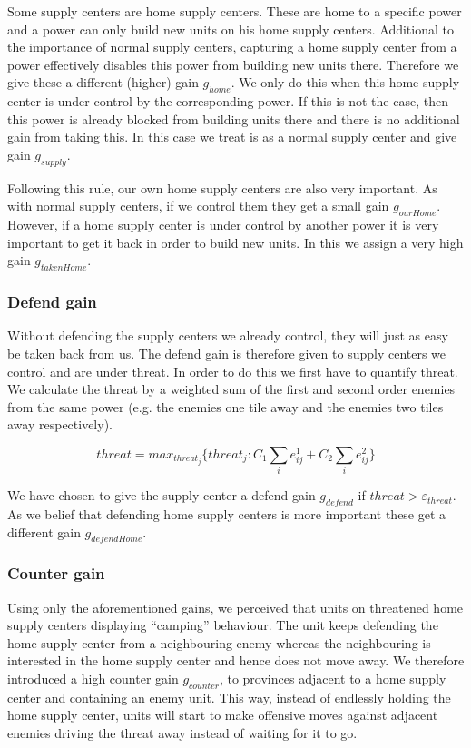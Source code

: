 \documentclass[a4paper]{article} %
\begin{document}
Some supply centers are home supply centers. These are home to a specific power and a power can only build new units on his home supply centers. Additional to the importance of normal supply centers, capturing a home supply center from a power effectively disables this power from building new units there. Therefore we give these a different (higher) gain $g_{home}$. We only do this when this home supply center is under control by the corresponding power. If this is not the case, then this power is already blocked from building units there and there is no additional gain from taking this. In this case we treat is as a normal supply center and give gain $g_{supply}$.

Following this rule, our own home supply centers are also very important. As with normal supply centers, if we control them they get a small gain $g_{ourHome}$. However, if a home supply center is under control by another power it is very important to get it back in order to build new units. In this we assign a very high gain $g_{takenHome}$. 

\subsubsection{Defend gain}

Without defending the supply centers we already control, they will just as easy be taken back from us. The defend gain is therefore given to supply centers we control and are under threat. In order to do this we first have to quantify threat. We calculate the threat by a weighted sum of the first and second order enemies from the same power (e.g. the enemies one tile away and the enemies two tiles away respectively). 

$$threat = max_{threat_j}\{ threat_j : C_1 \sum_{i} e^{1}_{ij} + C_2 \sum_{i} e^{2}_{ij}\}$$

We have chosen to give the supply center a defend gain $g_{defend}$ if $threat > \varepsilon_{threat}$. As we belief that defending home supply centers is more important these get a different gain $g_{defendHome}$. 

\subsubsection{Counter gain}
Using only the aforementioned gains, we perceived that units on threatened home supply centers displaying  ``camping'' behaviour. The unit keeps defending the home supply center from a neighbouring enemy whereas the neighbouring is interested in the home supply center and hence does not move away. We therefore introduced a high counter gain $g_{counter}$, to provinces adjacent to a home supply center and containing an enemy unit. This way, instead of endlessly holding the home supply center, units will start to make offensive moves against adjacent enemies driving the threat away instead of waiting for it to go.        
\end{document}
